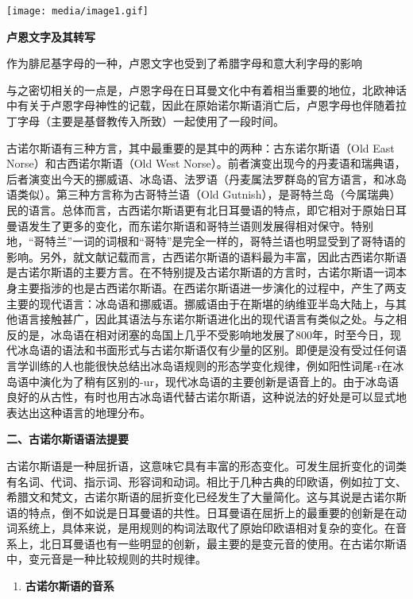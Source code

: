 \texttt{[image: media/image1.gif]}

\textbf{卢恩文字及其转写}

作为腓尼基字母的一种，卢恩文字也受到了希腊字母和意大利字母的影响

与之密切相关的一点是，卢恩字母在日耳曼文化中有着相当重要的地位，北欧神话中有关于卢恩字母神性的记载，因此在原始诺尔斯语消亡后，卢恩字母也伴随着拉丁字母（主要是基督教传入所致）一起使用了一段时间。

古诺尔斯语有三种方言，其中最重要的是其中的两种：古东诺尔斯语（Old East
Norse）和古西诺尔斯语（Old West
Norse）。前者演变出现今的丹麦语和瑞典语，后者演变出今天的挪威语、冰岛语、法罗语（丹麦属法罗群岛的官方语言，和冰岛语类似）。第三种方言称为古哥特兰语（Old
Gutnish），是哥特兰岛（今属瑞典）民的语言。总体而言，古西诺尔斯语更有北日耳曼语的特点，即它相对于原始日耳曼语发生了更多的变化，而东诺尔斯语和哥特兰语则发展得相对保守。特别地，``哥特兰''一词的词根和``哥特''是完全一样的，哥特兰语也明显受到了哥特语的影响。另外，就文献记载而言，古西诺尔斯语的语料最为丰富，因此古西诺尔斯语是古诺尔斯语的主要方言。在不特别提及古诺尔斯语的方言时，古诺尔斯语一词本身主要指涉的也是古西诺尔斯语。在西诺尔斯语进一步演化的过程中，产生了两支主要的现代语言：冰岛语和挪威语。挪威语由于在斯堪的纳维亚半岛大陆上，与其他语言接触甚广，因此其语法与东诺尔斯语进化出的现代语言有类似之处。与之相反的是，冰岛语在相对闭塞的岛国上几乎不受影响地发展了800年，时至今日，现代冰岛语的语法和书面形式与古诺尔斯语仅有少量的区别。即便是没有受过任何语言学训练的人也能很快总结出冰岛语规则的形态学变化规律，例如阳性词尾-r在冰岛语中演化为了稍有区别的-ur，现代冰岛语的主要创新是语音上的。由于冰岛语良好的从古性，有时也用古冰岛语代替古诺尔斯语，这种说法的好处是可以显式地表达出这种语言的地理分布。

\textbf{二、古诺尔斯语语法提要}

古诺尔斯语是一种屈折语，这意味它具有丰富的形态变化。可发生屈折变化的词类有名词、代词、指示词、形容词和动词。相比于几种古典的印欧语，例如拉丁文、希腊文和梵文，古诺尔斯语的屈折变化已经发生了大量简化。这与其说是古诺尔斯语的特点，倒不如说是日耳曼语的共性。日耳曼语在屈折上的最重要的创新是在动词系统上，具体来说，是用规则的构词法取代了原始印欧语相对复杂的变化。在音系上，北日耳曼语也有一些明显的创新，最主要的是变元音的使用。在古诺尔斯语中，变元音是一种比较规则的共时规律。

\begin{enumerate}
\def\labelenumi{\Alph{enumi}.}
\item
  \textbf{古诺尔斯语的音系}
\end{enumerate}

